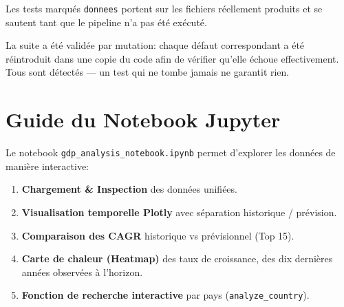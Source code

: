 \documentclass[11pt,a4paper]{article}
\begin{document}
Les tests marqués \texttt{donnees} portent sur les fichiers réellement produits et se sautent tant que le pipeline n'a pas été exécuté.

La suite a été validée par mutation: chaque défaut correspondant a été réintroduit dans une copie du code afin de vérifier qu'elle échoue effectivement. Tous sont détectés --- un test qui ne tombe jamais ne garantit rien.

\section{Guide du Notebook Jupyter}

Le notebook \texttt{gdp\_analysis\_notebook.ipynb} permet d'explorer les données de manière interactive:
\begin{enumerate}
    \item \textbf{Chargement \& Inspection} des données unifiées.
    \item \textbf{Visualisation temporelle Plotly} avec séparation historique / prévision.
    \item \textbf{Comparaison des CAGR} historique vs prévisionnel (Top 15).
    \item \textbf{Carte de chaleur (Heatmap)} des taux de croissance, des dix dernières années observées à l'horizon.
    \item \textbf{Fonction de recherche interactive} par pays (\texttt{analyze\_country}).
\end{enumerate}
\end{document}
